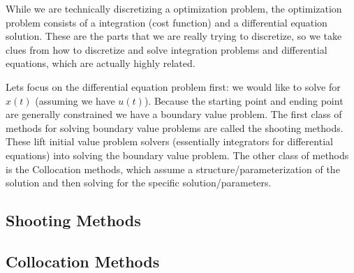 \documentclass[a4paper, 10pt, twocolumn]{article}
\begin{document}
While we are technically discretizing a optimization problem, the optimization problem consists of a integration (cost function) and a differential equation solution. These are the parts that we are really trying to discretize, so we take clues from how to discretize and solve integration problems and differential equations, which are actually highly related.

Lets focus on the differential equation problem first: we would like to solve for \(x(t)\) (assuming we have \(u(t)\)). Because the starting point and ending point are generally constrained we have a boundary value problem. The first class of methods for solving boundary value problems are called the shooting methods. These lift initial value problem solvers (essentially integrators for differential equations) into solving the boundary value problem. The other class of methods is the Collocation methods, which assume a structure/parameterization of the solution and then solving for the specific solution/parameters.

\subsection{Shooting Methods}

\subsection{Collocation Methods}
\end{document}
